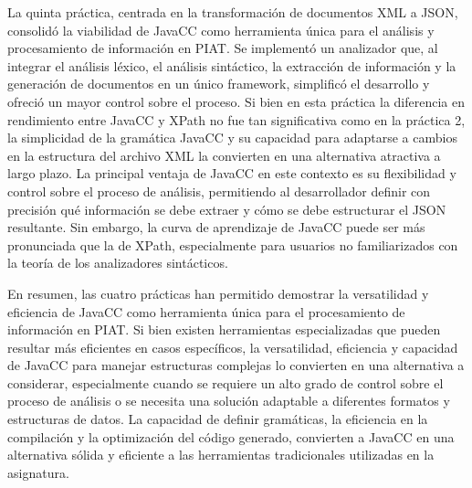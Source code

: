 
La quinta práctica, centrada en la transformación de documentos XML a JSON, consolidó la viabilidad de JavaCC como herramienta única para el análisis y procesamiento de información en PIAT. Se implementó un analizador que, al integrar el análisis léxico, el análisis sintáctico, la extracción de información y la generación de documentos en un único framework, simplificó el desarrollo y ofreció un mayor control sobre el proceso. Si bien en esta práctica la diferencia en rendimiento entre JavaCC y XPath no fue tan significativa como en la práctica 2, la simplicidad de la gramática JavaCC y su capacidad para adaptarse a cambios en la estructura del archivo XML la convierten en una alternativa atractiva a largo plazo. La principal ventaja de JavaCC en este contexto es su flexibilidad y control sobre el proceso de análisis, permitiendo al desarrollador definir con precisión qué información se debe extraer y cómo se debe estructurar el JSON resultante. Sin embargo, la curva de aprendizaje de JavaCC puede ser más pronunciada que la de XPath, especialmente para usuarios no familiarizados con la teoría de los analizadores sintácticos.

En resumen, las cuatro prácticas han permitido demostrar la versatilidad y eficiencia de JavaCC como herramienta única para el procesamiento de información en PIAT. Si bien existen herramientas especializadas que pueden resultar más eficientes en casos específicos, la versatilidad, eficiencia y capacidad de JavaCC para manejar estructuras complejas lo convierten en una alternativa a considerar, especialmente cuando se requiere un alto grado de control sobre el proceso de análisis o se necesita una solución adaptable a diferentes formatos y estructuras de datos. La capacidad de definir gramáticas, la eficiencia en la compilación y la optimización del código generado, convierten a JavaCC en una alternativa sólida y eficiente a las herramientas tradicionales utilizadas en la asignatura.





